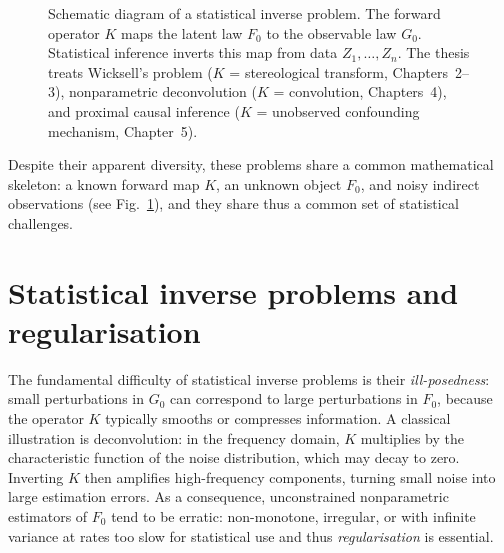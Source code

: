 \begin{figure}[H]
\centering
{}
\caption{Schematic diagram of a statistical inverse problem. The forward operator $K$ maps the latent law $F_0$ to the observable law $G_0$. Statistical inference inverts this map from data $Z_1,\ldots,Z_n$. The thesis treats Wicksell's problem ($K$ = stereological transform, Chapters~2--3), nonparametric deconvolution ($K$ = convolution, Chapters~4), and proximal causal inference ($K$ = unobserved confounding mechanism, Chapter~5).}
\label{fig: inverse problem schematic}
\end{figure}

Despite their apparent diversity, these problems share a common mathematical skeleton: a known forward map $K$, an unknown object $F_0$, and noisy indirect observations (see Fig.\ \ref{fig: inverse problem schematic}), and they share thus a common set of statistical challenges.

\section{Statistical inverse problems and regularisation}\label{sec: inverse problems intro}
The fundamental difficulty of statistical inverse problems is their \textit{ill-posedness}: small perturbations in $G_0$ can correspond to large perturbations in $F_0$, because the operator $K$ typically smooths or compresses information. A classical illustration is deconvolution: in the frequency domain, $K$ multiplies by the characteristic function of the noise distribution, which may decay to zero. Inverting $K$ then amplifies high-frequency components, turning small noise into large estimation errors. As a consequence, unconstrained nonparametric estimators of $F_0$ tend to be erratic: non-monotone, irregular, or with infinite variance at rates too slow for statistical use and thus \textit{regularisation} is essential.

